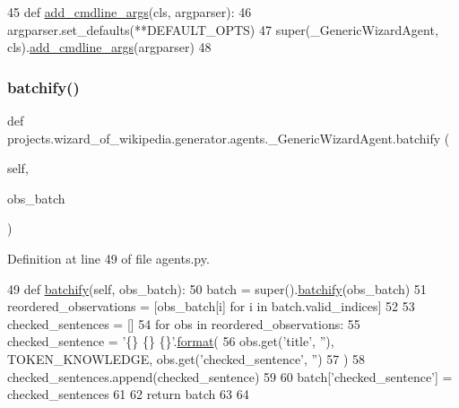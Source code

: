 \begin{DoxyCode}
45     \textcolor{keyword}{def }\hyperlink{namespaceparlai_1_1agents_1_1drqa_1_1config_a62fdd5554f1da6be0cba185271058320}{add\_cmdline\_args}(cls, argparser):
46         argparser.set\_defaults(**DEFAULT\_OPTS)
47         super(\_GenericWizardAgent, cls).\hyperlink{namespaceparlai_1_1agents_1_1drqa_1_1config_a62fdd5554f1da6be0cba185271058320}{add\_cmdline\_args}(argparser)
48 
\end{DoxyCode}
\mbox{\label{classprojects_1_1wizard__of__wikipedia_1_1generator_1_1agents_1_1__GenericWizardAgent_a898b6da1e93aa458966616f0208681fc}} 
\subsubsection{\texorpdfstring{batchify()}{batchify()}}
{\footnotesize\ttfamily def projects.\+wizard\+\_\+of\+\_\+wikipedia.\+generator.\+agents.\+\_\+\+Generic\+Wizard\+Agent.\+batchify (\begin{DoxyParamCaption}\item[{}]{self,  }\item[{}]{obs\+\_\+batch }\end{DoxyParamCaption})}



Definition at line 49 of file agents.\+py.


\begin{DoxyCode}
49     \textcolor{keyword}{def }\hyperlink{namespaceparlai_1_1agents_1_1drqa_1_1utils_aca22dd97c5b6dcda2a7479c1cb22ef1e}{batchify}(self, obs\_batch):
50         batch = super().\hyperlink{namespaceparlai_1_1agents_1_1drqa_1_1utils_aca22dd97c5b6dcda2a7479c1cb22ef1e}{batchify}(obs\_batch)
51         reordered\_observations = [obs\_batch[i] \textcolor{keywordflow}{for} i \textcolor{keywordflow}{in} batch.valid\_indices]
52 
53         checked\_sentences = []
54         \textcolor{keywordflow}{for} obs \textcolor{keywordflow}{in} reordered\_observations:
55             checked\_sentence = \textcolor{stringliteral}{'\{\} \{\} \{\}'}.\hyperlink{namespaceparlai_1_1chat__service_1_1services_1_1messenger_1_1shared__utils_a32e2e2022b824fbaf80c747160b52a76}{format}(
56                 obs.get(\textcolor{stringliteral}{'title'}, \textcolor{stringliteral}{''}), TOKEN\_KNOWLEDGE, obs.get(\textcolor{stringliteral}{'checked\_sentence'}, \textcolor{stringliteral}{''})
57             )
58             checked\_sentences.append(checked\_sentence)
59 
60         batch[\textcolor{stringliteral}{'checked\_sentence'}] = checked\_sentences
61 
62         \textcolor{keywordflow}{return} batch
63 
64 
\end{DoxyCode}


